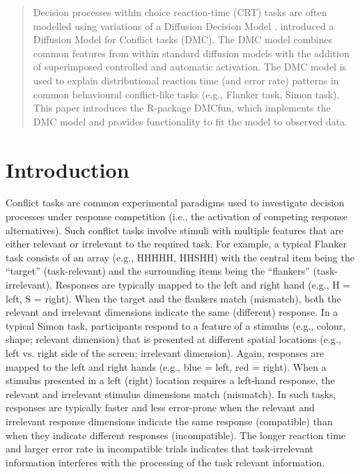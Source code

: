 \begin{abstract}

    Decision processes within choice reaction-time (CRT) tasks are often
    modelled using variations of a Diffusion Decision Model \parencite[DDM, for
    a review, see][] {ratcliff2008diffusion}. \textcite{ulrich2015automatic}
    introduced a Diffusion Model for Conflict tasks (DMC). The DMC model
    combines common features from within standard diffusion models with the
    addition of superimposed controlled and automatic activation. The DMC model
    is used to explain distributional reaction time (and error rate) patterns
    in common behavioural conflict-like tasks (e.g., Flanker task, Simon task).
    This paper introduces the R-package DMCfun, which implements the DMC model
    and provides functionality to fit the model to observed data.


\end{abstract}

\section{Introduction}
\label{introduction}

Conflict tasks \parencite[e.g., Flanker task, Simon task, Stroop task,
see][, respectively]{eriksen1974effects, lu1995influence, macleod1991half} are
common experimental paradigms used to investigate decision processes under
response competition (i.e., the activation of competing response alternatives).
Such conflict tasks involve stimuli with multiple features that are either
relevant or irrelevant to the required task. For example, a typical Flanker
task consists of an array (e.g., HHHHH, HHSHH) with the central item being the
``target'' (task-relevant) and the surrounding items being the
``flankers'' (task-irrelevant). Responses are typically mapped to the left and
right hand (e.g., H = left, S = right). When the target and the flankers match
(mismatch), both the relevant and irrelevant dimensions indicate the same
(different) response. In a typical Simon task, participants respond to a
feature of a stimulus (e.g., colour, shape; relevant dimension) that is
presented at different spatial locations (e.g., left vs. right side of the
screen; irrelevant dimension). Again, responses are mapped to the left and
right hands (e.g., blue = left, red = right). When a stimulus presented in a
left (right) location requires a left-hand response, the relevant and
irrelevant stimulus dimensions match (mismatch). In such tasks, responses are
typically faster and less error-prone when the relevant and irrelevant response
dimensions indicate the same response (compatible) than when they indicate
different responses (incompatible). The longer reaction time and larger error
rate in incompatible trials indicates that task-irrelevant information
interferes with the processing of the task relevant information.
    

